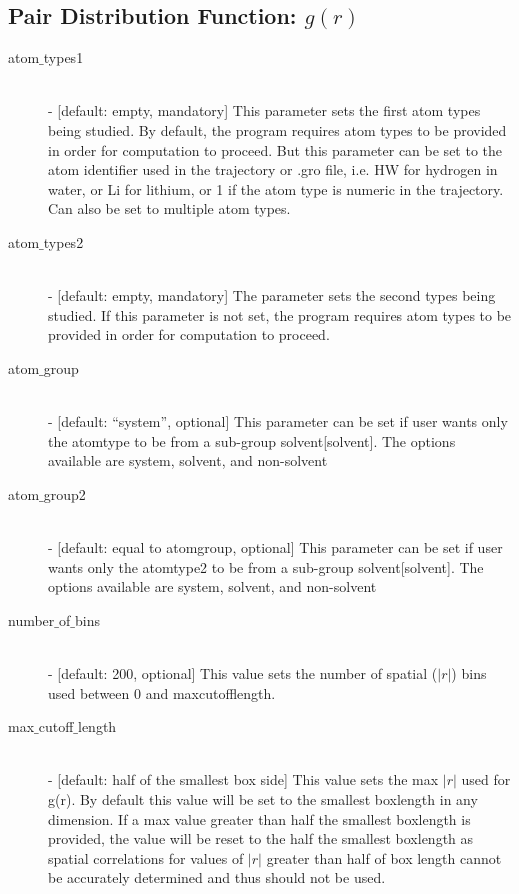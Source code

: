\documentclass{article}
\begin{document}
\subsection{Pair Distribution Function: $g(r)$} \label{sec::gofr_parm}
\begin{description}	
	\item[atom$\_$types1] \hfill \\
	- [default: empty, mandatory] This parameter sets the first atom types being studied.  By default, the program requires atom types to be provided in order for computation to proceed.  But this parameter can be set to the atom identifier used in the trajectory or .gro file, i.e. HW for hydrogen in water, or Li for lithium, or 1 if the atom type is numeric in the trajectory.  Can also be set to multiple atom types.
	
	\item[atom$\_$types2] \hfill \\
	- [default: empty, mandatory] The parameter sets the second types being studied.  If this parameter is not set, the program requires atom types to be provided in order for computation to proceed.
	
	\item[atom$\_$group] \hfill \\
	- [default: ``system'', optional] This parameter can be set if user wants only the atomtype to be from a sub-group solvent[solvent].  The options available are system, solvent, and non-solvent
	
	\item[atom$\_$group2] \hfill \\
	- [default: equal to atomgroup, optional] This parameter can be set if user wants only the atomtype2 to be from a sub-group solvent[solvent].  The options available are system, solvent, and non-solvent
		
	\item[number$\_$of$\_$bins] \hfill \\
	- [default: 200, optional] This value sets the number of spatial ($|r|$) bins used between 0 and maxcutofflength.
	
	\item[max$\_$cutoff$\_$length] \hfill \\
	- [default: half of the smallest box side] This value sets the max $|r|$ used for g(r).  By default this value will be set to the smallest boxlength in any dimension.  If a max value greater than half the smallest boxlength is provided, the value will be reset to the half the smallest boxlength as spatial correlations for values of $|r|$ greater than half of box length cannot be accurately determined and thus should not be used.
	
\end{description}
\end{document}
